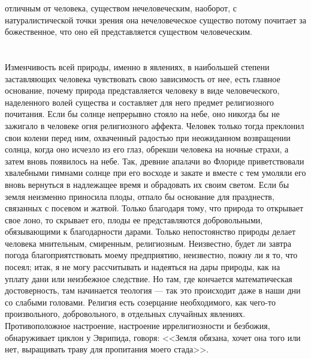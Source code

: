 \documentclass[12pt]{article}
\begin{document}
отличным от человека, существом нечеловеческим, наоборот, с натуралистической точки зрения она нечеловеческое существо потому почитает за божественное, что оно ей представляется существом человеческим.


\section{}

Изменчивость всей природы, именно в явлениях, в наибольшей степени заставляющих человека чувствовать свою зависимость от нее, есть главное основание, почему природа представляется человеку в виде человеческого, наделенного волей существа и составляет для него предмет религиозного почитания. Если бы солнце непрерывно стояло на небе, оно никогда бы не зажигало в человеке огня религиозного аффекта. Человек только тогда преклонил свои колени перед ним, охваченный радостью при неожиданном возвращении солнца, когда оно исчезло из его глаз, обрекши человека на ночные страхи, а затем вновь появилось на небе. Так, древние апалачи во Флориде приветствовали хвалебными гимнами солнце при его восходе и закате и вместе с тем умоляли его вновь вернуться в надлежащее время и обрадовать их своим светом. Если бы земля неизменно приносила плоды, отпало бы основание для празднеств, связанных с посевом и жатвой. Только благодаря тому, что природа то открывает свое лоно, то скрывает его, плоды ее представляются добровольными, обязывающими к благодарности дарами. Только непостоянство природы делает человека мнительным, смиренным, религиозным. Неизвестно, будет ли завтра погода благоприятствовать моему предприятию, неизвестно, пожну ли я то, что посеял; итак, я не могу рассчитывать и надеяться на дары природы, как на уплату дани или неизбежное следствие. Но там, где кончается математическая достоверность, там начинается теология --- так это происходит даже в наши дни со слабыми головами. Религия есть созерцание необходимого, как чего-то произвольного, добровольного, в отдельных случайных явлениях. Противоположное настроение, настроение иррелигиозности и безбожия, обнаруживает циклон у Эврипида, говоря: <<Земля обязана, хочет она того или нет, выращивать траву для пропитания моего стада>>.


\section{}
\end{document}
